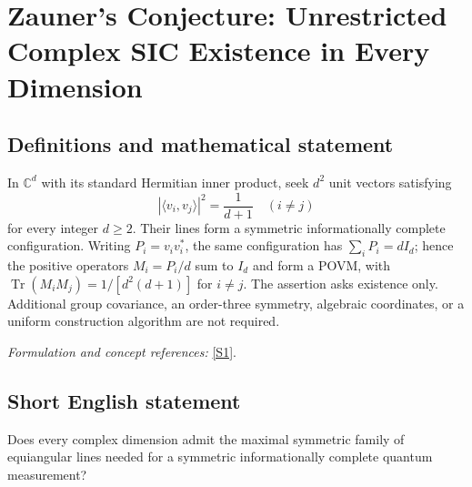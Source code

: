 \documentclass[11pt,a4paper]{article}
\newcommand{\C}{\mathbb{C}}
\newcommand{\sref}[2]{\hyperlink{source:#1:#2}{[S#2]}}
\newif\ifshowcatalogue
\newcommand{\cataloguescope}[1]{\ifshowcatalogue
 \paragraph{Exact scope in the supplied catalogue.}
 \begin{quote}\small #1\end{quote}\fi}
\numberwithin{equation}{section}
\begin{document}
\setcounter{section}{230}
\clearpage
\section{\texorpdfstring{Zauner's Conjecture: Unrestricted Complex SIC Existence in Every Dimension}{Zauner's Conjecture: Unrestricted Complex SIC Existence in Every Dimension}}\label{231}
\subsection{Definitions and mathematical statement}
In $\C^d$ with its standard Hermitian inner product, seek $d^2$ unit vectors satisfying
\[
 |\langle v_i,v_j\rangle|^2=\frac1{d+1}\quad(i\ne j)
\]
for every integer $d\ge2$. Their lines form a symmetric informationally complete configuration. Writing $P_i=v_iv_i^*$, the same configuration has
$\sum_iP_i=dI_d$; hence the positive operators $M_i=P_i/d$ sum to $I_d$ and form a POVM, with
$\operatorname{Tr}(M_iM_j)=1/[d^2(d+1)]$ for $i\ne j$. The assertion asks existence only. Additional group covariance, an order-three symmetry, algebraic coordinates, or a uniform construction algorithm are not required.
\par\smallskip\textit{Formulation and concept references:} \sref{231}{1}.
\cataloguescope{Decide whether for EVERY integer d>=2 there exist d\textasciicircum{}2 unit vectors v\_1,...,v\_(d\textasciicircum{}2) in the standard complex Hilbert space C\textasciicircum{}d with |<v\_i,v\_j>|\textasciicircum{}2=1/(d+1) whenever i!=j. Their complex lines are distinct. Equivalently, their rank-one projectors P\_i=v\_i v\_i\textasciicircum{}* have sum\_i P\_i=d I\_d and define SIC-POVM elements M\_i=P\_i/d; for i!=j the normalized trace is Tr(M\_i M\_j)=1/[d\textasciicircum{}2(d+1)]. No Weyl-Heisenberg covariance, order-three symmetry, explicit coordinates or uniform construction algorithm is imposed.}
\subsection{Short English statement}
Does every complex dimension admit the maximal symmetric family of equiangular lines needed for a symmetric informationally complete quantum measurement?
\end{document}
